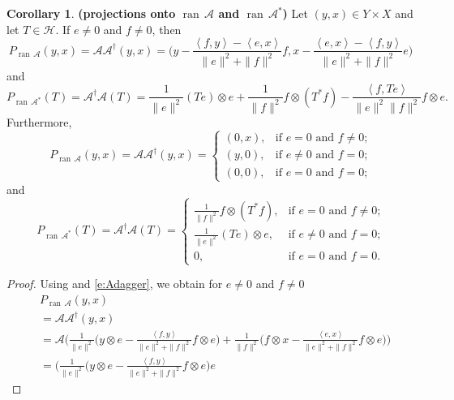 \documentclass[12pt]{article}
\newcommand{\scal}[2]{\left\langle{#1},{#2}  \right\rangle}
\newcommand{\ran}{\ensuremath{{\operatorname{ran}}\,}}
\theoremstyle{definition}
\newtheorem{corollary}[theorem]{Corollary}
\providecommand{\ran}{\operatorname{ran}}
\providecommand{\ran}{\operatorname{ran}}
\providecommand{\mA}{\mathcal{A}}
\providecommand{\mH}{\mathcal{H}}
\begin{document}
{\begin{corollary}\textbf{(projections onto $\ran\mA$ and $\ran\mA^*$)}
\label{c:ranges}
Let $(y,x)\in{Y}\times{X}$
and let $T\in\mH$.
If $e\neq 0$ and $f\neq 0$, 
then
\begin{equation}
\label{e:PranA}
P_{\ran \mA}(y,x)
= \mA\mA^\dagger(y,x) = 
\Big( 
y-\frac{\scal{f}{y}-\scal{e}{x}}{\|e\|^2 + \|f\|^2}f,
x-\frac{\scal{e}{x}-\scal{f}{y}}{\|e\|^2 + \|f\|^2}e
\Big)
\end{equation}
and 
\begin{equation}
\label{e:PranA^*}
P_{\ran \mA^*}(T) = \mA^\dagger \mA(T) 
= 
\frac{1}{\|e\|^2} (Te) \otimes e
+ \frac{1}{\|f\|^2}f\otimes(T^*f)
- \frac{\scal{f}{{Te}}}{\|e\|^2\|f\|^2} f\otimes e. 
\end{equation}
Furthermore, 
\begin{equation}
P_{\ran \mA}(y,x)
= \mA\mA^\dagger(y,x) =
\begin{cases}
(0,x), &\text{if $e=0$ and $f\neq 0$;}\\[+1mm]
(y,0), &\text{if $e\neq 0$ and $f= 0$;}\\[+1mm]
(0,0), &\text{if $e=0$ and $f= 0$;}
\end{cases}
\end{equation}
and 
\begin{equation}
P_{\ran \mA^*}(T)
= \mA^\dagger\mA(T) =
\begin{cases}
\displaystyle \frac{1}{\|f\|^2}f\otimes(T^*f), &\text{if $e=0$ and $f\neq 0$;}\\[+4mm]
\displaystyle \frac{1}{\|e\|^2}(Te)\otimes e, &\text{if $e\neq 0$ and $f= 0$;}\\[+4mm]
0, &\text{if $e=0$ and $f= 0$.}
\end{cases}
\end{equation}
\end{corollary}
\begin{proof}
Using \cite[Proposition~3.30(ii)]{BC2017} and 
\cref{e:Adagger}, we obtain 
{ 
for $e\neq 0$ and $f\neq 0$
}
\begin{subequations}
\begin{align}
&P_{\ran \mA}(y,x)\\ 
&= \mA\mA^\dagger(y,x)\\
&=\mA\bigg(\frac{1}{\|e\|^2}\Big( y\otimes e - 
\frac{\scal{f}{{y}}}{\|e\|^2+\|f\|^2} f\otimes e\Big) + 
\frac{1}{\|f\|^2}\Big( f \otimes x - 
\frac{\scal{e}{x}}{\|e\|^2+\|f\|^2} f\otimes e\Big)\bigg)\\
&= \bigg(\frac{1}{\|e\|^2}\Big( y\otimes e - 
\frac{\scal{f}{{y}}}{\|e\|^2+\|f\|^2} f\otimes e\Big)e

\end{align}
\end{subequations}
\end{proof}}
\end{document}

